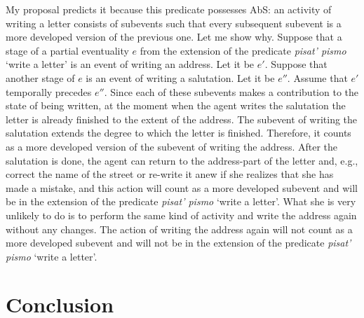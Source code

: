 \documentclass[output=paper,
]{langscibook}
\begin{document}
\z

\noindent My proposal predicts it because this predicate possesses AbS: an activity of writing a letter consists of subevents such that every subsequent subevent is a more developed version of the previous one. Let me show why. Suppose that a stage of a partial eventuality $e$ from the extension of the predicate \textit{pisat’ pismo} `write a letter' is an event of writing an address. Let it be $e'$. Suppose that another stage of $e$ is an event of writing a salutation. Let it be $e''$. Assume that $e'$ temporally precedes $e''$. Since each of these subevents makes a contribution to the state of being written, at the moment when the agent writes the salutation the letter is already finished to the extent of the address. The subevent of writing the salutation extends the degree to which the letter is finished. Therefore, it counts as a more developed version of the subevent of writing the address. After the salutation is done, the agent can return to the address-part of the letter and, e.g., correct the name of the street or re-write it anew if she realizes that she has made a mistake, and this action will count as a more developed subevent and will be in the extension of the predicate \textit{pisat’ pismo} `write a letter'. What she is very unlikely to do is to perform the same kind of activity and write the address again without any changes. The action of writing the address again will not count as a more developed subevent and will not be in the extension of the predicate \textit{pisat’ pismo} `write a letter'.

\section{Conclusion} \label{sec:naumov:4}
\end{document}
